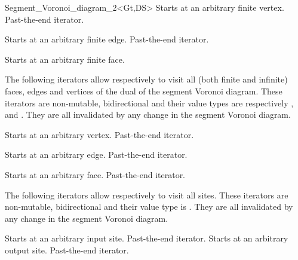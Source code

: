 \begin{ccRefClass}{Segment_Voronoi_diagram_2<Gt,DS>}
{Starts at an arbitrary finite vertex.}
\ccGlue
{}
{Past-the-end iterator.}

{Starts at an arbitrary finite edge.}
\ccGlue
{}
{Past-the-end iterator.}

{Starts at an arbitrary finite face.}
\ccGlue
{}

The following iterators allow respectively to visit all
(both finite and infinite) faces, edges and vertices
of the dual of the segment Voronoi diagram. These iterators are
non-mutable, bidirectional and their value types are respectively
,  and . 
They are all invalidated by any change in the segment Voronoi diagram.


{Starts at an arbitrary  vertex.}
\ccGlue
{}
{Past-the-end iterator.}

{Starts at an arbitrary edge.}
\ccGlue
{}
{Past-the-end iterator.}

{Starts at an arbitrary face.}
\ccGlue
{}
{Past-the-end iterator.}




The following iterators allow respectively to visit 
all sites. These iterators are non-mutable, bidirectional and their
value type is . They are all invalidated by any change in
the segment Voronoi diagram.


{Starts at an arbitrary input site.}
\ccGlue
{}
{Past-the-end iterator.}
\ccGlue
{}
{Starts at an arbitrary output site.}
\ccGlue
{}
{Past-the-end iterator.}


\ccThreeToTwo




\end{ccRefClass}
